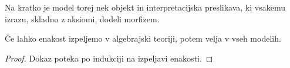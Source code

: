 Na kratko je model torej nek objekt in interpretacijska preslikava, ki vsakemu izrazu, skladno z aksiomi, dodeli morfizem.

\begin{proposition}[Zdravost]
    Če lahko enakost izpeljemo v algebrajski teoriji, potem velja v vseh modelih.
\end{proposition}

\begin{proof}
    Dokaz poteka po indukciji na izpeljavi enakosti.
\end{proof}
